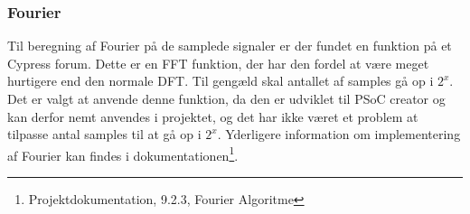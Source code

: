 
\subsubsection{Fourier}

Til beregning af Fourier på de samplede signaler er der fundet en funktion på et Cypress forum\cite{FFTalgo}. Dette er en FFT funktion, der har den fordel at være meget hurtigere end den normale DFT. Til gengæld skal antallet af samples gå op i $2^{x}$. Det er valgt at anvende denne funktion, da den er udviklet til PSoC creator og kan derfor nemt anvendes i projektet, og det har ikke været et problem at tilpasse antal samples til at gå op i $2^{x}$. Yderligere information om implementering af Fourier kan findes i dokumentationen\footnote{Projektdokumentation, 9.2.3, Fourier Algoritme}. 